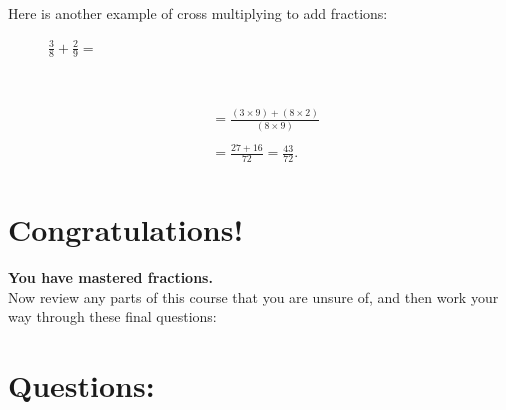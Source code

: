 \documentclass[14pt]{article}
\begin{document}
\begin{enumerate}
Here is another example of cross multiplying to add fractions:
\begin{figure}[ht]
\begin{minipage}[ht]{0.4\linewidth} \centering
\begin{large}$\frac{3}{8}+\frac{2}{9}=$\end{large}\\
\vspace{8pt}
\end{minipage}
\begin{minipage}[ht]{0.6\linewidth} \centering 
\begin{center}
\begin{align*}
&=\frac{(3\times9)+(8\times2)}{(8\times9)}\\\\
&=\frac{27+16}{72}=\frac{43}{72}.\\
\end{align*}
\end{center}
\end{minipage}
\end{figure}

\end{enumerate}

\section*{Congratulations!}

\textbf{You have mastered fractions.}\\

Now review any parts of this course that you are unsure of, and then work your way through these final questions:

\section*{Questions:}
\end{document}
